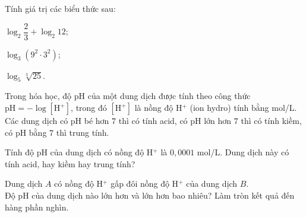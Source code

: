 \begin{vd}%
	Tính giá trị các biểu thức sau:
	\begin{listEX}[3]
		\item[a)] $ \log_2 \dfrac{2}{3}+\log_2 12$;
		\item[b)] $ \log_3 \left(9^2\cdot 3^2\right)$;
		\item [c)] $ \log_5 \sqrt[3]{25}$.
	\end{listEX}
\end{vd}

\begin{vd}%
	Trong hóa học, độ  pH  của một dung dịch được tính theo công thức $\text{pH}=-\log[\text{H}^+] $, trong đó $ [\text{H}^+] $ là nồng độ  H$^+ $ (ion hydro) tính bằng mol/L. Các dung dịch có  pH  bé hơn $ 7 $ thì có tính acid, có pH  lớn hơn $ 7 $ thì có tính kiềm, có  pH  bằng $ 7 $ thì trung tính.
	\begin{listEX}[1]
		\item[a)] Tính độ  pH  của dung dịch có nồng độ H$^+ $ là $ 0{,}0001 $ mol/L. Dung dịch này có tính acid, hay kiềm hay trung tính?
		\item[b)] Dung dịch $ A $ có nồng độ  H$^+ $ gấp đôi nồng độ  H$^+ $ của dung dịch $ B $.\\
		Độ pH  của dung dịch nào lớn hơn và lớn hơn bao nhiêu? Làm tròn kết quả đến hàng phần nghìn.
	\end{listEX}
\end{vd}

